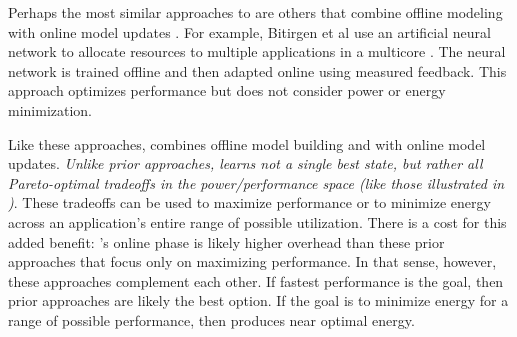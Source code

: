 Perhaps the most similar approaches to \SYSTEMLEO{} are others that
combine offline modeling with online model updates
\cite{ICSE2014,Bitirgen2008,Ipek}.  For example, Bitirgen et al use an
artificial neural network to allocate resources to multiple
applications in a multicore \cite{Bitirgen2008}.  The neural network
is trained offline and then adapted online using measured feedback.
This approach optimizes performance but does not consider power or
energy minimization.

Like these approaches, \SYSTEMLEO{} combines offline model building and
with online model updates.  \emph{Unlike prior approaches, \SYSTEMLEO{}
  learns not a single best state, but rather all Pareto-optimal
  tradeoffs in the power/performance space (like those illustrated in
  )}.  These tradeoffs can be used to maximize
performance or to minimize energy across an application's entire range
of possible utilization.  There is a cost for this added benefit:
\SYSTEMLEO{}'s online phase is likely higher overhead than these prior
approaches that focus only on maximizing performance.  In that sense,
however, these approaches complement each other.  If fastest
performance is the goal, then prior approaches are likely the best
option.  If the goal is to minimize energy for a range of possible
performance, then \SYSTEMLEO{} produces near optimal energy.

